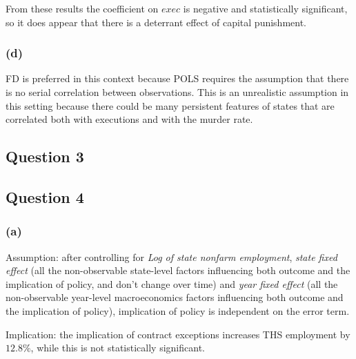 \documentclass[
]{article}
\begin{document}
From these results the coefficient on \(exec\) is negative and
statistically significant, so it does appear that there is a deterrant
effect of capital punishment.

\hypertarget{d}{%
\subsubsection{(d)}\label{d}}

FD is preferred in this context because POLS requires the assumption
that there is no serial correlation between observations. This is an
unrealistic assumption in this setting because there could be many
persistent features of states that are correlated both with executions
and with the murder rate.

\newpage

\hypertarget{question-3}{%
\subsection{Question 3}\label{question-3}}

\newpage

\hypertarget{question-4}{%
\subsection{Question 4}\label{question-4}}

\hypertarget{a-1}{%
\subsubsection{(a)}\label{a-1}}

Assumption: after controlling for \emph{Log of state nonfarm
employment}, \emph{state fixed effect} (all the non-observable
state-level factors influencing both outcome and the implication of
policy, and don't change over time) and \emph{year fixed effect} (all
the non-observable year-level macroeconomics factors influencing both
outcome and the implication of policy), implication of policy is
independent on the error term.

Implication: the implication of contract exceptions increases THS
employment by \(12.8\%\), while this is not statistically significant.
\end{document}
